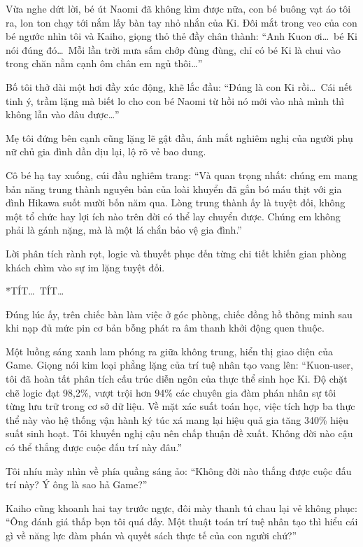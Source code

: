 \documentclass[../main.tex]{subfiles}
\begin{document}
Vừa nghe dứt lời, bé út Naomi đã không kìm được nữa, con bé buông vạt áo tôi ra, lon ton chạy tới nắm lấy bàn tay nhỏ nhắn của Ki. Đôi mắt trong veo của con bé ngước nhìn tôi và Kaiho, giọng thỏ thẻ đầy chân thành: ``Anh Kuon ơi\dots\ bé Ki nói đúng đó\dots\ Mỗi lần trời mưa sấm chớp đùng đùng, chỉ có bé Ki là chui vào trong chăn nằm cạnh ôm chân em ngủ thôi\dots''

Bố tôi thở dài một hơi đầy xúc động, khẽ lắc đầu: ``Đúng là con Ki rồi\dots\ Cái nết tinh ý, trầm lặng mà biết lo cho con bé Naomi từ hồi nó mới vào nhà mình thì không lẫn vào đâu được\dots''

Mẹ tôi đứng bên cạnh cũng lặng lẽ gật đầu, ánh mắt nghiêm nghị của người phụ nữ chủ gia đình dần dịu lại, lộ rõ vẻ bao dung.

Cô bé hạ tay xuống, cúi đầu nghiêm trang: ``Và quan trọng nhất: chúng em mang bản năng trung thành nguyên bản của loài khuyển đã gắn bó máu thịt với gia đình Hikawa suốt mười bốn năm qua. Lòng trung thành ấy là tuyệt đối, không một tổ chức hay lợi ích nào trên đời có thể lay chuyển được. Chúng em không phải là gánh nặng, mà là một lá chắn bảo vệ gia đình.''

Lời phân tích rành rọt, logic và thuyết phục đến từng chi tiết khiến gian phòng khách chìm vào sự im lặng tuyệt đối.

*TÍT\dots\ TÍT\dots*

Đúng lúc ấy, trên chiếc bàn làm việc ở góc phòng, chiếc đồng hồ thông minh sau khi nạp đủ mức pin cơ bản bỗng phát ra âm thanh khởi động quen thuộc.

Một luồng sáng xanh lam phóng ra giữa không trung, hiển thị giao diện của Game. Giọng nói kim loại phẳng lặng của trí tuệ nhân tạo vang lên: ``Kuon-user, tôi đã hoàn tất phân tích cấu trúc diễn ngôn của thực thể sinh học Ki. Độ chặt chẽ logic đạt 98,2\%, vượt trội hơn 94\% các chuyên gia đàm phán nhân sự tôi từng lưu trữ trong cơ sở dữ liệu. Về mặt xác suất toán học, việc tích hợp ba thực thể này vào hệ thống vận hành ký túc xá mang lại hiệu quả gia tăng 340\% hiệu suất sinh hoạt. Tôi khuyến nghị cậu nên chấp thuận đề xuất. Không đời nào cậu có thể thắng được cuộc đấu trí này đâu.''

Tôi nhíu mày nhìn về phía quầng sáng ảo: ``Không đời nào thắng được cuộc đấu trí này? Ý ông là sao hả Game?''

Kaiho cũng khoanh hai tay trước ngực, đôi mày thanh tú chau lại vẻ không phục: ``Ông đánh giá thấp bọn tôi quá đấy. Một thuật toán trí tuệ nhân tạo thì hiểu cái gì về năng lực đàm phán và quyết sách thực tế của con người chứ?''
\end{document}
